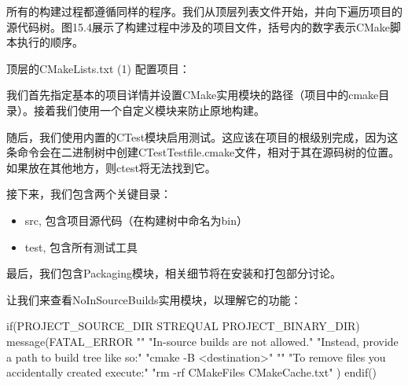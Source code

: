 
所有的构建过程都遵循同样的程序。我们从顶层列表文件开始，并向下遍历项目的源代码树。图15.4展示了构建过程中涉及的项目文件，括号内的数字表示CMake脚本执行的顺序。


顶层的CMakeLists.txt (1) 配置项目：



我们首先指定基本的项目详情并设置CMake实用模块的路径（项目中的cmake目录）。接着我们使用一个自定义模块来防止原地构建。

随后，我们使用内置的CTest模块启用测试。这应该在项目的根级别完成，因为这条命令会在二进制树中创建CTestTestfile.cmake文件，相对于其在源码树的位置。如果放在其他地方，则ctest将无法找到它。

接下来，我们包含两个关键目录：

\begin{itemize}
\item
src, 包含项目源代码（在构建树中命名为bin）

\item
test, 包含所有测试工具
\end{itemize}

最后，我们包含Packaging模块，相关细节将在安装和打包部分讨论。

让我们来查看NoInSourceBuilds实用模块，以理解它的功能：


\begin{cmake}
if(PROJECT_SOURCE_DIR STREQUAL PROJECT_BINARY_DIR)
    message(FATAL_ERROR
        "\n"
        "In-source builds are not allowed.\n"
        "Instead, provide a path to build tree like so:\n"
        "cmake -B <destination>\n"
        "\n"
        "To remove files you accidentally created execute:\n"
        "rm -rf CMakeFiles CMakeCache.txt\n"
    )
endif()
\end{cmake}

